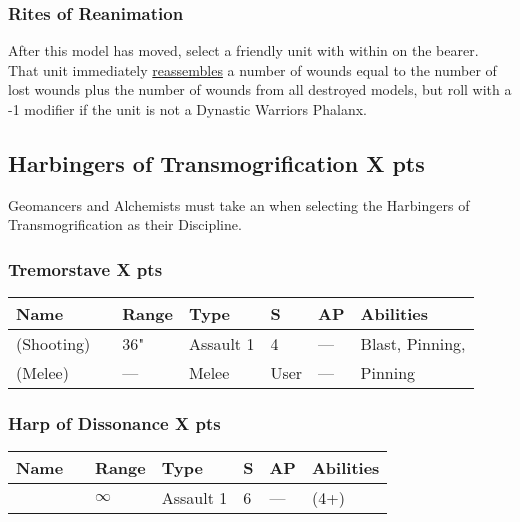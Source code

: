 \subsubsection{Rites of Reanimation} \label{Rites of Reanimation}

After this model has moved, select a friendly unit with  within  on the bearer. That unit immediately \textcolor{violet}{\hyperref[Reanimation Protocols]{reassembles}} a number of wounds equal to the number of lost wounds plus the number of wounds from all destroyed models, but roll with a -1 modifier if the unit is not a Dynastic Warriors Phalanx.



\subsection[Harbingers of Transmogrification ]{Harbingers of Transmogrification  \hrulefill X pts}

Geomancers and Alchemists must take an  when selecting the Harbingers of Transmogrification as their Discipline.

\subsubsection[Tremorstave]{Tremorstave \hrulefill X pts}
\label{Tremorstave}
\noindent
\begin{tabular}{||m{130pt} m{10pt} m{31pt} m{55pt} m{12pt} m{12pt} m{210pt}||}
	\hline
	Name & & Range & Type & S & AP & Abilities \\
	\hline
	\quickref{Tremorstave} (Shooting) & & 36" & Assault 1 & 4 & — & Blast, Pinning, \quickref{Quake} \\
	\quickref{Tremorstave} (Melee) & & — & Melee & User & — & Pinning \\
	\hline
\end{tabular}

\subsubsection[Harp of Dissonance ]{Harp of Dissonance  \hrulefill X pts}

\label{Harp of Dissonance}
\noindent
\begin{tabular}{||m{130pt} m{10pt} m{31pt} m{55pt} m{12pt} m{12pt} m{210pt}||}
	\hline
	Name & & Range & Type & S & AP & Abilities \\
	\hline
	\quickref{Harp of Dissonance} & & $\infty$ & Assault 1 & 6 & — & \quickref{Entropic Strike} (4+) \\
	\hline
\end{tabular}

